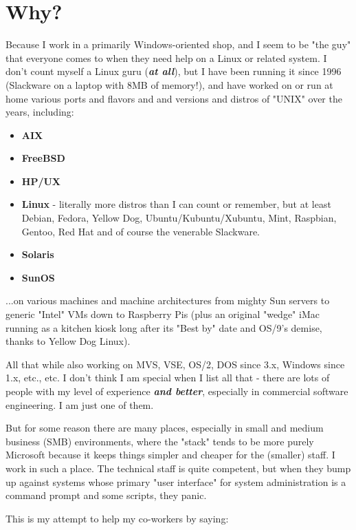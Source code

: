 \documentclass[10pt,]{book}
\numberwithin{figure}{chapter}
\begin{document}
\section*{Why?}\label{why}

Because I work in a primarily Windows-oriented shop, and I seem to be
"the guy" that everyone comes to when they need help on a Linux or
related system. I don't count myself a Linux guru (\textbf{\emph{at
all}}), but I have been running it since 1996 (Slackware on a laptop
with 8MB of memory!), and have worked on or run at home various ports
and flavors and and versions and distros of "UNIX" over the years,
including:

\begin{itemize}
\item
  \textbf{AIX}
\item
  \textbf{FreeBSD}
\item
  \textbf{HP/UX}
\item
  \textbf{Linux} - literally more distros than I can count or remember,
  but at least Debian, Fedora, Yellow Dog, Ubuntu/Kubuntu/Xubuntu, Mint,
  Raspbian, Gentoo, Red Hat and of course the venerable Slackware.
\item
  \textbf{Solaris}
\item
  \textbf{SunOS}
\end{itemize}

...on various machines and machine architectures from mighty Sun servers
to generic "Intel" VMs down to Raspberry Pis (plus an original "wedge"
iMac running as a kitchen kiosk long after its "Best by" date and OS/9's
demise, thanks to Yellow Dog Linux).

All that while also working on MVS, VSE, OS/2, DOS since 3.x, Windows
since 1.x, etc., etc. I don't think I am special when I list all that -
there are lots of people with my level of experience \textbf{\emph{and
better}}, especially in commercial software engineering. I am just one
of them.

But for some reason there are many places, especially in small and
medium business (SMB) environments, where the "stack" tends to be more
purely Microsoft because it keeps things simpler and cheaper for the
(smaller) staff. I work in such a place. The technical staff is quite
competent, but when they bump up against systems whose primary "user
interface" for system administration is a command prompt and some
scripts, they panic.

This is my attempt to help my co-workers by saying:
\end{document}

